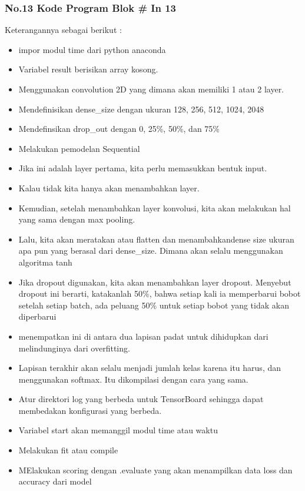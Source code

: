 \subsubsection{No.13 Kode Program Blok \# In 13}

Keterangannya sebagai berikut :\\
\begin{itemize}
\item impor modul time dari python anaconda
\item Variabel result berisikan array kosong.
\item Menggunakan convolution 2D yang dimana akan memiliki 1 atau 2 layer.
\item Mendefinisikan dense\_size dengan ukuran 128, 256, 512, 1024, 2048
\item Mendefinsikan drop\_out dengan 0, 25\%, 50\%, dan 75\%
\item Melakukan pemodelan Sequential
\item Jika ini adalah layer pertama, kita perlu memasukkan bentuk input.
\item Kalau tidak kita hanya akan menambahkan layer.
\item Kemudian, setelah menambahkan layer konvolusi, kita akan melakukan hal yang sama dengan max pooling.
\item  Lalu, kita akan meratakan atau flatten dan menambahkandense size ukuran apa pun yang berasal dari dense\_size. Dimana akan selalu menggunakan algoritma tanh
\item Jika dropout digunakan, kita akan menambahkan layer dropout. Menyebut dropout ini berarti, katakanlah 50\%, bahwa setiap kali ia memperbarui bobot setelah setiap batch, ada peluang 50\% untuk setiap bobot yang tidak akan diperbarui
\item menempatkan ini di antara dua lapisan padat untuk dihidupkan dari melindunginya dari overfitting.
\item  Lapisan terakhir akan selalu menjadi jumlah kelas karena itu harus, dan menggunakan softmax. Itu dikompilasi dengan cara yang sama.
\item Atur direktori log yang berbeda untuk TensorBoard sehingga dapat membedakan konfigurasi yang berbeda.
\item Variabel start akan memanggil modul time atau waktu
\item Melakukan fit atau compile 
\item MElakukan scoring dengan .evaluate yang akan menampilkan data loss dan accuracy dari model

\end{itemize}
